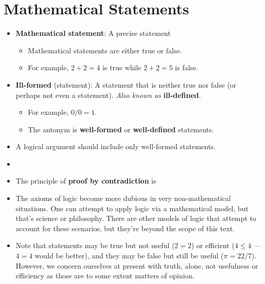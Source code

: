 \documentclass[../main.tex]{subfiles}
\begin{document}
\section{Mathematical Statements}
\begin{itemize}
    \item \textbf{Mathematical statement}: A precise statement 
    \begin{itemize}
        \item Mathematical statements are either true or false.
        \item For example, $2+2=4$ is true while $2+2=5$ is false.
    \end{itemize}
    \item \textbf{Ill-formed} (statement): A statement that is neither true nor false (or perhaps not even a statement). \emph{Also known as} \textbf{ill-defined}.
    \begin{itemize}
        \item For example, $0/0=1$.
        \item The antonym is \textbf{well-formed} or \textbf{well-defined} statements.
    \end{itemize}
    \item A logical argument should include only well-formed statements.
    \item {}
    \item The principle of \textbf{proof by contradiction} is 
    \item The axioms of logic become more dubious in very non-mathematical situations. One can attempt to apply logic via a mathematical model, but that's science or philosophy. There are other models of logic that attempt to account for these scenarios, but they're beyond the scope of this text.
    \item Note that statements may be true but not useful ($2=2$) or efficient ($4\leq 4$ --- $4=4$ would be better), and they may be false but still be useful ($\pi=22/7$). However, we concern ourselves at present with truth, alone, not usefulness or efficiency as those are to some extent matters of opinion.

\end{itemize}
\end{document}
